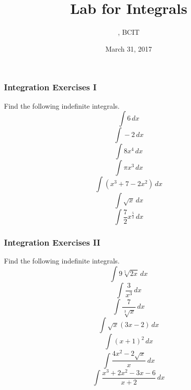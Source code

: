 \documentclass[xcolor=dvipsnames]{beamer}
\title{Lab for Integrals}
\subtitle{{\CourseNumber}, BCIT}
\author{\CourseName}
\date{March 31, 2017}
\begin{document}
\begin{frame}
  \titlepage
\end{frame}

\begin{frame}
  \frametitle{Integration Exercises I}
Find the following indefinite integrals.
\begin{equation}
  \label{eq:eevoomoh}
  \int{}6\,dx
\end{equation}
\begin{equation}
  \label{eq:eohauthu}
  \int{}-2\,dx
\end{equation}
\begin{equation}
  \label{eq:heizieta}
  \int{}8x^{4}\,dx
\end{equation}
\begin{equation}
  \label{eq:zohjieph}
  \int{}\pi{}x^{3}\,dx
\end{equation}
\begin{equation}
  \label{eq:oodaelad}
  \int{}\left(x^{3}+7-2x^{2}\right)\,dx
\end{equation}
\begin{equation}
  \label{eq:eeshooyo}
  \int{}\sqrt{x}\,dx
\end{equation}
\begin{equation}
  \label{eq:uafievai}
  \int{}\frac{7}{2}x^{\frac{5}{2}}\,dx
\end{equation}
\end{frame}

\begin{frame}
  \frametitle{Integration Exercises II}
Find the following indefinite integrals.
\begin{equation}
  \label{eq:igheivei}
  \int{}9\sqrt[5]{2x}\,dx
\end{equation}
\begin{equation}
  \label{eq:akahheju}
  \int{}\frac{3}{x^{3}}\,dx
\end{equation}
\begin{equation}
  \label{eq:zeifahce}
  \int{}\frac{7}{\sqrt[3]{x}}\,dx
\end{equation}
\begin{equation}
  \label{eq:afahthud}
  \int{}\sqrt{x}\left(3x-2\right)\,dx
\end{equation}
\begin{equation}
  \label{eq:desheiga}
  \int{}\left(x+1\right)^{2}\,dx
\end{equation}
\begin{equation}
  \label{eq:oongaiqu}
  \int{}\frac{4x^{2}-2\sqrt{x}}{x}\,dx
\end{equation}
\begin{equation}
  \label{eq:ahxiequo}
  \int{}\frac{x^{3}+2x^{2}-3x-6}{x+2}\,dx
\end{equation}
\end{frame}
\end{document}
